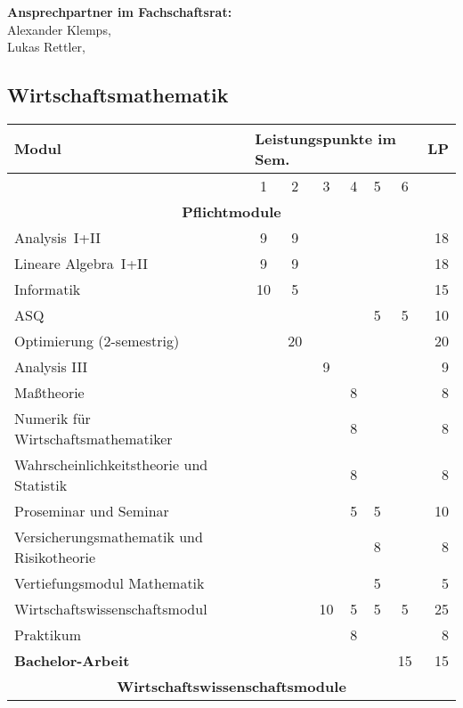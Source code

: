 \textbf{Ansprechpartner im Fachschaftsrat:}\\
Alexander Klemps, \\
Lukas Rettler, \\

\newpage

\subsection{Wirtschaftsmathematik}
\label{studiengang_wima}

\begin{table}[tbp]
	\begin{small}
		\begin{tabularx}{\textwidth}{|X||c|c|c|c|c|c||r|}\hline
			\textbf{Modul}&\multicolumn{6}{l||}{\textbf{Leistungspunkte im Sem.}}&\textbf{LP}\\\hline
			&1&2&3&4&5&6&\\\hline\hline
			\multicolumn{8}{|c|}{\textbf{Pflichtmodule}}\\\hline
			Analysis~I+II&9&9&&&&&18\\\hline
			Lineare Algebra~I+II&9&9&&&&&18\\\hline
			Informatik&10&5&&&&&15\\\hline
			ASQ&&&&&5&5&10\\\hline
			Optimierung (2-semestrig)&&20&&&&&20\\\hline
			Analysis III&&&9&&&&9\\\hline
			Maßtheorie&&&&8&&&8\\\hline
			Numerik für Wirtschaftsmathematiker&&&&8&&&8\\\hline
			Wahrscheinlichkeitstheorie und Statistik&&&&8&&&8\\\hline
			Proseminar und Seminar&&&&5&5&&10\\\hline
			Versicherungsmathematik und Risikotheorie&&&&&8&&8\\\hline
			Vertiefungsmodul Mathematik&&&&&5&&5\\\hline
			Wirtschaftswissenschaftsmodul&&&10&5&5&5&25\\\hline
			Praktikum&&&&8&&&8\\\hline\hline
			\textbf{Bachelor-Arbeit}&&&&&&15&15\\\hline\hline
			\multicolumn{8}{|c|}{\textbf{Wirtschaftswissenschaftsmodule}}\\\hline

\end{tabularx}
\end{small}
\end{table}
